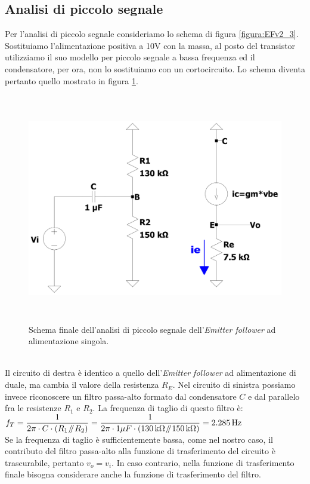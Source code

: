 \documentclass{report}
\newcommand{\parallelsum}{\mathbin{\!/\mkern-5mu/\!}}
\begin{document}
\subsection{Analisi di piccolo segnale}  
Per l'analisi di piccolo segnale consideriamo lo schema di figura \ref{figura:EFv2_3}. Sostituiamo l'alimentazione positiva a 10V con la massa, al posto del transistor utilizziamo il suo modello per piccolo segnale a bassa frequenza ed il condensatore, per ora, non lo sostituiamo con un cortocircuito. Lo schema diventa pertanto quello mostrato in figura \ref{figura:EFv2_3_ps}.
\begin{figure}[h]
\centering
\includegraphics[height=10cm]{immagini/EFv2_3_ps}
\caption{Schema finale dell'analisi di piccolo segnale dell'\textit{Emitter follower} ad alimentazione singola.}
\label{figura:EFv2_3_ps}
\end{figure}
\\Il circuito di destra è identico a quello dell'\textit{Emitter follower} ad alimentazione di duale, ma cambia il valore della resistenza $R_E$. Nel circuito di sinistra possiamo invece riconoscere un filtro passa-alto formato dal condensatore $C$ e dal parallelo fra le resistenze $R_1$ e $R_2$. La frequenza di taglio di questo filtro è:
\\[2pt]\indent $\displaystyle{f_T=\frac{1}{2\pi\cdot C\cdot (R_1\parallelsum R_2)}=\frac{1}{2\pi\cdot 1\mu F\cdot(\SI{130}{k\ohm}\parallelsum\SI{150}{k\ohm})}=\SI{2.285}{\hertz}}$
\\[2pt]Se la frequenza di taglio è sufficientemente bassa, come nel nostro caso, il contributo del filtro passa-alto alla funzione di trasferimento del circuito è trascurabile, pertanto $v_o=v_i$. In caso contrario, nella funzione di trasferimento finale bisogna considerare anche la funzione di trasferimento del filtro.
\end{document}
